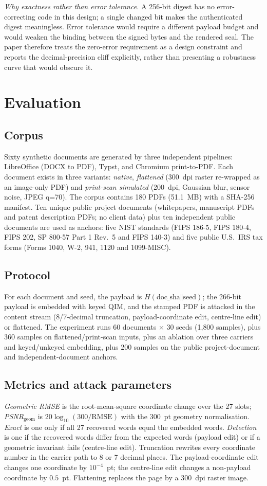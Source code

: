 \documentclass[journal]{IEEEtran}
\begin{document}
\emph{Why exactness rather than error tolerance.} A 256-bit digest has no error-correcting code in this design; a single changed bit makes the authenticated digest meaningless. Error tolerance would require a different payload budget and would weaken the binding between the signed bytes and the rendered seal. The paper therefore treats the zero-error requirement as a design constraint and reports the decimal-precision cliff explicitly, rather than presenting a robustness curve that would obscure it.

\section{Evaluation}\label{sec:eval}
\subsection{Corpus}
Sixty synthetic documents are generated by three independent pipelines: LibreOffice (DOCX to PDF), Typst, and Chromium print-to-PDF. Each document exists in three variants: \emph{native}, \emph{flattened} (300~dpi raster re-wrapped as an image-only PDF) and \emph{print-scan simulated} (200~dpi, Gaussian blur, sensor noise, JPEG q=70). The corpus contains 180 PDFs (51.1~MB) with a SHA-256 manifest. Ten unique public project documents (whitepapers, manuscript PDFs and patent description PDFs; no client data) plus ten independent public documents are used as anchors: five NIST standards (FIPS 186-5, FIPS 180-4, FIPS 202, SP 800-57 Part 1 Rev.~5 and FIPS 140-3) and five public U.S.\ IRS tax forms (Forms 1040, W-2, 941, 1120 and 1099-MISC).

\subsection{Protocol}
For each document and seed, the payload is $H(\text{doc\_sha}\Vert\text{seed})$; the 266-bit payload is embedded with keyed QIM, and the stamped PDF is attacked in the content stream (8/7-decimal truncation, payload-coordinate edit, centre-line edit) or flattened. The experiment runs 60 documents $\times$ 30 seeds (1{,}800 samples), plus 360 samples on flattened/print-scan inputs, plus an ablation over three carriers and keyed/unkeyed embedding, plus 200 samples on the public project-document and independent-document anchors.

\subsection{Metrics and attack parameters}
\emph{Geometric RMSE} is the root-mean-square coordinate change over the 27 slots; \emph{PSNR$_{\text{geom}}$} is $20\log_{10}(300/\text{RMSE})$ with the 300~pt geometry normalisation. \emph{Exact} is one only if all 27 recovered words equal the embedded words. \emph{Detection} is one if the recovered words differ from the expected words (payload edit) or if a geometric invariant fails (centre-line edit). Truncation rewrites every coordinate number in the carrier path to 8 or 7 decimal places. The payload-coordinate edit changes one coordinate by $10^{-4}$~pt; the centre-line edit changes a non-payload coordinate by $0.5$~pt. Flattening replaces the page by a 300~dpi raster image.
\end{document}
